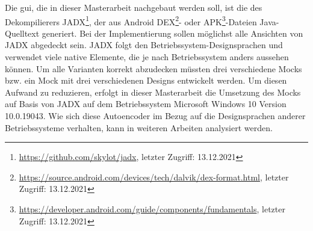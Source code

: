 Die \gls{gui}, die in dieser Masterarbeit nachgebaut werden soll, ist die des Dekompilierers JADX\footnote{\url{https://github.com/skylot/jadx}, letzter Zugriff: 13.12.2021}, der aus Android DEX\footnote{\url{https://source.android.com/devices/tech/dalvik/dex-format.html}, letzter Zugriff: 13.12.2021}- oder APK\footnote{\url{https://developer.android.com/guide/components/fundamentals}, letzter Zugriff: 13.12.2021}-Dateien Java-Quelltext generiert.
Bei der Implementierung sollen möglichst alle Ansichten von JADX abgedeckt sein. JADX folgt den Betriebssystem-Designsprachen und verwendet viele native Elemente, die je nach Betriebssystem anders aussehen können. Um alle Varianten korrekt abzudecken müssten drei verschiedene Mocks bzw. ein Mock mit drei verschiedenen Designs entwickelt werden. Um diesen Aufwand zu reduzieren, erfolgt in dieser Masterarbeit die Umsetzung des Mocks auf Basis von JADX auf dem Betriebssystem Microsoft Windows 10 Version \mbox{10.0.19043}. Wie sich diese Autoencoder im Bezug auf die Designsprachen anderer Betriebssysteme verhalten, kann in weiteren Arbeiten analysiert werden.






